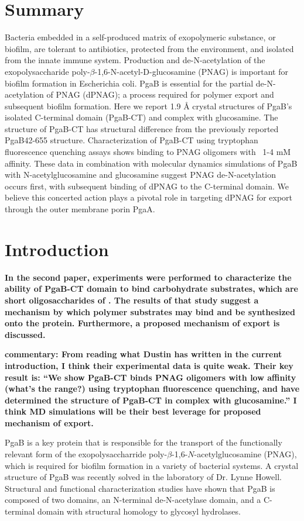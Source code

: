 \section{Summary}
Bacteria embedded in a self-produced matrix of exopolymeric substance, or biofilm, are tolerant to antibiotics, protected from the environment, and isolated from the innate immune system. Production and de-N-acetylation of the exopolysaccharide poly-$\beta$-1,6-N-acetyl-D-glucosamine (PNAG) is important for biofilm formation in Escherichia coli. PgaB is essential for the partial de-N-acetylation of PNAG (dPNAG); a process required for polymer export and subsequent biofilm formation. Here we report 1.9 Å crystal structures of PgaB’s isolated C-terminal domain (PgaB-CT) and complex with glucosamine. The structure of PgaB-CT has structural difference from the previously reported PgaB42-655 structure. Characterization of PgaB-CT using tryptophan fluorescence quenching assays shows binding to PNAG oligomers with ~1-4 mM affinity. These data in combination with molecular dynamics simulations of PgaB with N-acetylglucosamine and glucosamine suggest PNAG de-N-acetylation occurs first, with subsequent binding of dPNAG to the C-terminal domain. We believe this concerted action plays a pivotal role in targeting dPNAG for export through the outer membrane porin PgaA.

\section{Introduction}
\textbf{In the second paper, experiments were performed to characterize the ability of PgaB-CT domain to bind carbohydrate substrates, which are short oligosaccharides of \pnag. The results of that study suggest a mechanism by which polymer substrates may bind and be synthesized onto the protein.  Furthermore, a proposed mechanism of export is discussed.}

\textbf{commentary: From reading what Dustin has written in the current introduction, I think their experimental data is quite weak.  Their key result is:  ``We show PgaB-CT binds PNAG oligomers with low affinity (what's the range?) using tryptophan fluorescence quenching, and have determined the structure of PgaB-CT in complex with glucosamine.'' I think MD simulations will be their best leverage for proposed mechanism of export.}

PgaB is a key protein that is responsible for the transport of the functionally relevant form of the exopolysaccharride poly-$\beta$-1,6-$N$-acetylglucosamine (PNAG), which is required for biofilm formation in a variety of bacterial systems. A crystal structure of PgaB was recently solved in the laboratory of Dr. Lynne Howell. Structural and functional characterization studies have shown that PgaB is composed of two domains, an N-terminal de-N-acetylase domain, and a C-terminal domain with structural homology to glycosyl hydrolases.\cite{Little:2012dp}

